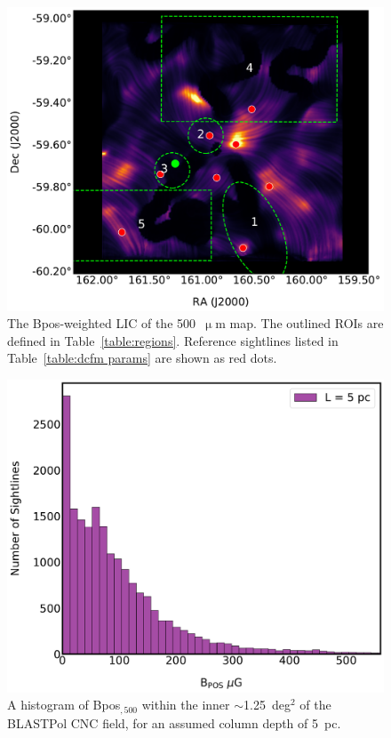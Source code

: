 \begin{figure}[!htbp]
\centering
\includegraphics[width=\textwidth]{figures/carina/B_lic_500_5p0pc}
\caption[~The  weighted LIC of the  map.]{The \gls{Bpos}-weighted LIC of the 500~$\upmu$m map. The outlined ROIs are defined in Table~\ref{table:regions}. Reference sightlines listed in Table~\ref{table:dcfm params} are shown as red dots.}
\label{fig:Bpos_LIC}
\end{figure}

\begin{figure}[!htbp]
\centering
\includegraphics[width=\textwidth]{figures/carina/B_hist_500}
\caption[~A histogram of  over the inner regions of the CNC.]{A histogram of \gls{Bpos}$_{,500}$ within the inner $\sim$1.25~deg$^{2}$ of the BLASTPol CNC field, for an assumed column depth of 5~pc.}
\label{fig:Bpos_hist}
\end{figure}

